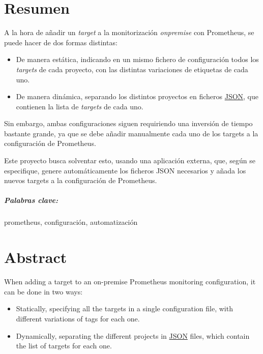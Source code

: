 \chapter*{Resumen}
\label{ch:resumen}

A la hora de añadir un \textit{target} a la monitorización \textit{onpremise} con Prometheus, se puede hacer de dos formas distintas:

\begin{itemize}
  \item De manera estática, indicando en un mismo fichero de configuración todos los \textit{targets} de cada proyecto, con las distintas variaciones de etiquetas de cada uno.
  \item De manera dinámica, separando los distintos proyectos en ficheros \url{JSON}, que contienen la lista de \textit{targets} de cada uno.
\end{itemize}

Sin embargo, ambas configuraciones siguen requiriendo una inversión de tiempo bastante grande, ya que se debe añadir manualmente cada uno de los targets a la configuración de Prometheus.

Este proyecto busca solventar esto, usando una aplicación externa, que, según se especifique, genere automáticamente los ficheros JSON necesarios y añada los nuevos targets a la configuración de Prometheus.

\paragraph*{Palabras clave:} prometheus, configuración, automatización


\newpage
    
\chapter*{Abstract}
\label{ch:abstract}
When adding a target to an on-premise Prometheus monitoring configuration, it can be done in two ways:
\begin{itemize}
  \item Statically, specifying all the targets in a single configuration file, with different variations of tags for each one.
  \item Dynamically, separating the different projects in \url{JSON} files, which contain the list of targets for each one.
\end{itemize}

